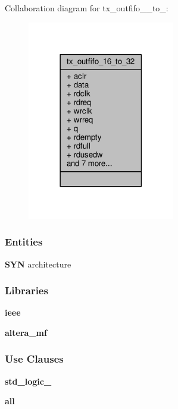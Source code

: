 Collaboration diagram for tx\+\_\+outfifo\+\_\+\_\+to\+\_\+:\nopagebreak
\begin{figure}[H]
\begin{center}
\leavevmode
\includegraphics[width=182pt]{da/d00/classtx__outfifo__16__to__32__coll__graph}
\end{center}
\end{figure}
\subsubsection*{Entities}
\begin{DoxyCompactItemize}
\item 
{\bf S\+YN} architecture
\end{DoxyCompactItemize}
\subsubsection*{Libraries}
 \begin{DoxyCompactItemize}
\item 
{\bf ieee} 
\item 
{\bf altera\+\_\+mf} 
\end{DoxyCompactItemize}
\subsubsection*{Use Clauses}
 \begin{DoxyCompactItemize}
\item 
{\bf std\+\_\+logic\+\_}   
\item 
{\bf  all }   
\end{DoxyCompactItemize}
